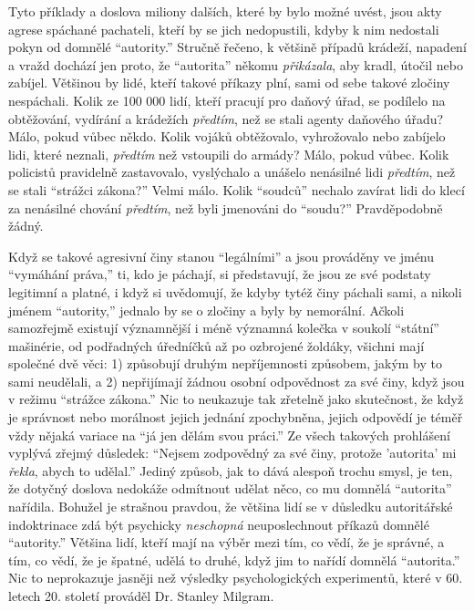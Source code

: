 \documentclass{book}
\begin{document}
Tyto příklady a doslova miliony dalších, které by bylo možné uvést, jsou akty agrese spáchané pachateli, kteří by se jich nedopustili, kdyby k nim nedostali pokyn od domnělé \enquote{autority.} Stručně řečeno, k většině případů krádeží, napadení a vražd dochází jen proto, že \enquote{autorita} někomu \emph{přikázala}, aby kradl, útočil nebo zabíjel. Většinou by lidé, kteří takové příkazy plní, sami od sebe takové zločiny nespáchali. Kolik ze 100 000 lidí, kteří pracují pro daňový úřad, se podílelo na obtěžování, vydírání a krádežích \emph{předtím}, než se stali agenty daňového úřadu? Málo, pokud vůbec někdo. Kolik vojáků obtěžovalo, vyhrožovalo nebo zabíjelo lidi, které neznali, \emph{předtím} než vstoupili do armády? Málo, pokud vůbec. Kolik policistů pravidelně zastavovalo, vyslýchalo a unášelo nenásilné lidi \emph{předtím}, než se stali \enquote{strážci zákona?} Velmi málo. Kolik \enquote{soudců} nechalo zavírat lidi do klecí za nenásilné chování \emph{předtím}, než byli jmenováni do \enquote{soudu?} Pravděpodobně žádný.

Když se takové agresivní činy stanou \enquote{legálními} a jsou prováděny ve jménu \enquote{vymáhání práva,} ti, kdo je páchají, si představují, že jsou ze své podstaty legitimní a platné, i když si uvědomují, že kdyby tytéž činy páchali sami, a nikoli jménem \enquote{autority,} jednalo by se o zločiny a byly by nemorální. Ačkoli samozřejmě existují významnější i méně významná kolečka v soukolí \enquote{státní} mašinérie, od podřadných úředníčků až po ozbrojené žoldáky, všichni mají společné dvě věci: 1) způsobují druhým nepříjemnosti způsobem, jakým by to sami neudělali, a 2) nepřijímají žádnou osobní odpovědnost za své činy, když jsou v režimu \enquote{strážce zákona.} Nic to neukazuje tak zřetelně jako skutečnost, že když je správnost nebo morálnost jejich jednání zpochybněna, jejich odpovědí je téměř vždy nějaká variace na \enquote{já jen dělám svou práci.} Ze všech takových prohlášení vyplývá zřejmý důsledek: \enquote{Nejsem zodpovědný za své činy, protože 'autorita' mi \emph{řekla}, abych to udělal.} Jediný způsob, jak to dává alespoň trochu smysl, je ten, že dotyčný doslova nedokáže odmítnout udělat něco, co mu domnělá \enquote{autorita} nařídila. Bohužel je strašnou pravdou, že většina lidí se v důsledku autoritářské indoktrinace zdá být psychicky \emph{neschopná} neuposlechnout příkazů domnělé \enquote{autority.} Většina lidí, kteří mají na výběr mezi tím, co vědí, že je správné, a tím, co vědí, že je špatné, udělá to druhé, když jim to nařídí domnělá \enquote{autorita.} Nic to neprokazuje jasněji než výsledky psychologických experimentů, které v 60. letech 20. století prováděl Dr. Stanley Milgram.
\end{document}
